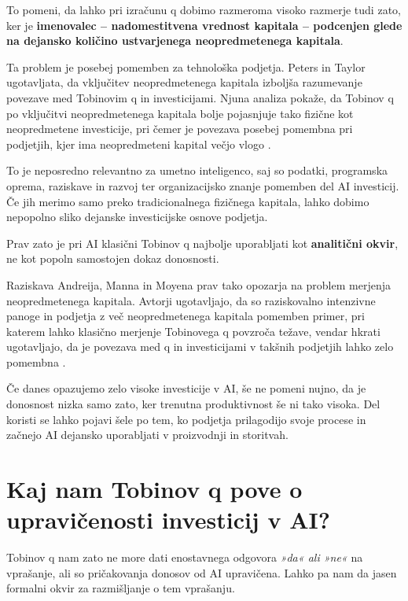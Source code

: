 \documentclass[12pt,a4paper]{article}
\begin{document}
To pomeni, da lahko pri izračunu q dobimo razmeroma visoko razmerje tudi zato, ker je \textbf{imenovalec -- nadomestitvena vrednost kapitala -- podcenjen glede na dejansko količino ustvarjenega neopredmetenega kapitala}.

Ta problem je posebej pomemben za tehnološka podjetja. Peters in Taylor ugotavljata, da vključitev neopredmetenega kapitala izboljša razumevanje povezave med Tobinovim q in investicijami. Njuna analiza pokaže, da Tobinov q po vključitvi neopredmetenega kapitala bolje pojasnjuje tako fizične kot neopredmetene investicije, pri čemer je povezava posebej pomembna pri podjetjih, kjer ima neopredmeteni kapital večjo vlogo \citep{PetersTaylor2016}.

To je neposredno relevantno za umetno inteligenco, saj so podatki, programska oprema, raziskave in razvoj ter organizacijsko znanje pomemben del AI investicij. Če jih merimo samo preko tradicionalnega fizičnega kapitala, lahko dobimo nepopolno sliko dejanske investicijske osnove podjetja.

Prav zato je pri AI klasični Tobinov q najbolje uporabljati kot \textbf{analitični okvir}, ne kot popoln samostojen dokaz donosnosti.

Raziskava Andreija, Manna in Moyena prav tako opozarja na problem merjenja neopredmetenega kapitala. Avtorji ugotavljajo, da so raziskovalno intenzivne panoge in podjetja z več neopredmetenega kapitala pomemben primer, pri katerem lahko klasično merjenje Tobinovega q povzroča težave, vendar hkrati ugotavljajo, da je povezava med q in investicijami v takšnih podjetjih lahko zelo pomembna \citep{AndreiMannMoyen2017}.

Če danes opazujemo zelo visoke investicije v AI, še ne pomeni nujno, da je donosnost nizka samo zato, ker trenutna produktivnost še ni tako visoka. Del koristi se lahko pojavi šele po tem, ko podjetja prilagodijo svoje procese in začnejo AI dejansko uporabljati v proizvodnji in storitvah.


\section{Kaj nam Tobinov q pove o upravičenosti investicij v AI?}

Tobinov q nam zato ne more dati enostavnega odgovora \textit{»da« ali »ne«} na vprašanje, ali so pričakovanja donosov od AI upravičena. Lahko pa nam da jasen formalni okvir za razmišljanje o tem vprašanju.
\end{document}
